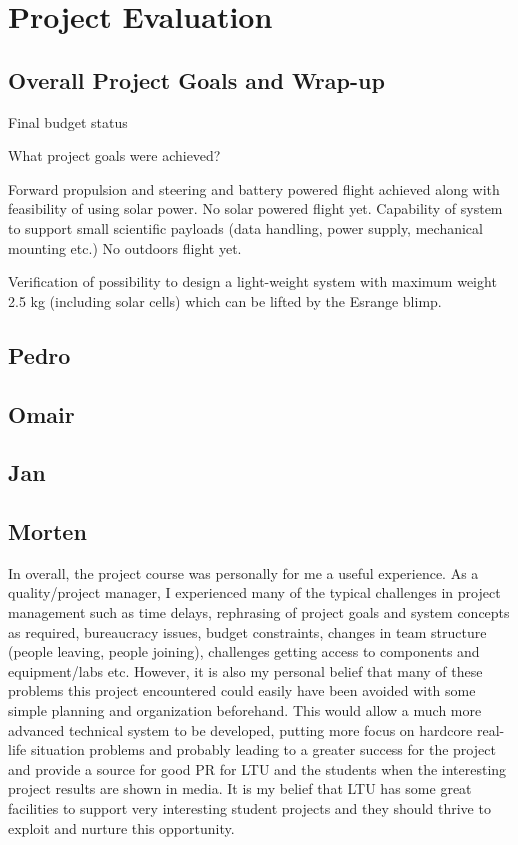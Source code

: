 \newpage
\chapter{Project Evaluation}
\label{chap:evaluation}

\section{Overall Project Goals and Wrap-up}



Final budget status

What project goals were achieved?

Forward propulsion and steering and battery powered flight achieved along with feasibility of using solar power. No solar powered flight yet. Capability of system to support small scientific payloads (data handling, power supply, mechanical mounting etc.) No outdoors flight yet.

Verification of possibility to design a light-weight system with maximum weight 2.5 kg (including solar cells) which can be lifted by the Esrange blimp.

\section{Pedro}


\section{Omair}


\section{Jan}


\section{Morten}
In overall, the project course was personally for me a useful experience. As a quality/project manager, I experienced many of the typical challenges in project management such as time delays, rephrasing of project goals and system concepts as required, bureaucracy issues, budget constraints, changes in team structure (people leaving, people joining), challenges getting access to components and equipment/labs etc. However, it is also my personal belief that many of these problems this project encountered could easily have been avoided with some simple planning and organization beforehand. This would allow a much more advanced technical system to be developed, putting more focus on hardcore real-life situation problems and probably leading to a greater success for the project and provide a source for good PR for LTU and the students when the interesting project results are shown in media. It is my belief that LTU has some great facilities to support very interesting student projects and they should thrive to exploit and nurture this opportunity.

